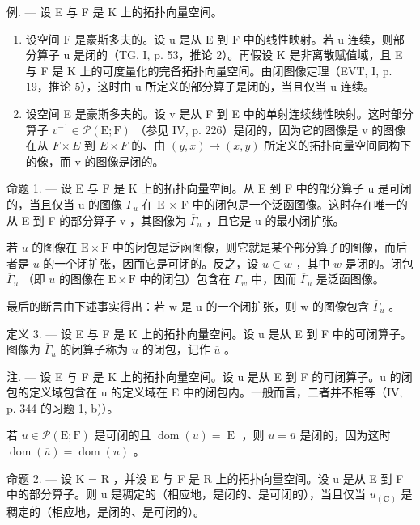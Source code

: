 例. --- 设 E 与 F 是 K 上的拓扑向量空间。

\begin{enumerate}
\def\labelenumi{\arabic{enumi})}
\item
  设空间 F 是豪斯多夫的。设 u 是从 E 到 F 中的线性映射。若 u 连续，则部分算子 u 是闭的（TG, I, p. 53，推论 2）。再假设 K 是非离散赋值域，且 E 与 F 是 K 上的可度量化的完备拓扑向量空间。由闭图像定理（EVT, I, p. 19，推论 5），这时由 u 所定义的部分算子是闭的，当且仅当 u 连续。
\item
  设空间 E 是豪斯多夫的。设 v 是从 F 到 E 中的单射连续线性映射。这时部分算子 \(v^{-1} \in \mathcal{P}(\mathrm{E};\mathrm{F})\) （参见 IV, p. 226）是闭的，因为它的图像是 v 的图像在从 \(F \times E\) 到 \(E \times F\) 的、由 \((y,x) \mapsto (x,y)\) 所定义的拓扑向量空间同构下的像，而 v 的图像是闭的。
\end{enumerate}

命题 1. --- 设 E 与 F 是 K 上的拓扑向量空间。从 E 到 F 中的部分算子 u 是可闭的，当且仅当 u 的图像 \(\Gamma_{u}\) 在 E × F 中的闭包是一个泛函图像。这时存在唯一的从 E 到 F 的部分算子 v ，其图像为 \(\overline{\Gamma}_{u}\) ，且它是 u 的最小闭扩张。

若 \(u\) 的图像在 \(\mathrm{E} \times \mathrm{F}\) 中的闭包是泛函图像，则它就是某个部分算子的图像，而后者是 \(u\) 的一个闭扩张，因而它是可闭的。反之，设 \(u \subset w\) ，其中 \(w\) 是闭的。闭包 \(\overline{\Gamma}_u\) （即 \(u\) 的图像在 \(\mathrm{E} \times \mathrm{F}\) 中的闭包）包含在 \(\Gamma_w\) 中，因而 \(\overline{\Gamma}_u\) 是泛函图像。

最后的断言由下述事实得出：若 w 是 u 的一个闭扩张，则 w 的图像包含 \(\overline{\Gamma}_{u}\) 。

定义 3. --- 设 E 与 F 是 K 上的拓扑向量空间。设 u 是从 E 到 F 中的可闭算子。图像为 \(\overline{\Gamma}_{u}\) 的闭算子称为 \(u\) 的闭包，记作 \(\overline{u}\) 。

注. --- 设 E 与 F 是 K 上的拓扑向量空间。设 u 是从 E 到 F 的可闭算子。u 的闭包的定义域包含在 u 的定义域在 E 中的闭包内。一般而言，二者并不相等（IV, p. 344 的习题 1, b)）。

若 \(u \in \mathcal{P}(\mathrm{E};\mathrm{F})\) 是可闭的且 \(\operatorname{dom}(u) = \operatorname{E}\) ，则 \(u = \overline{u}\) 是闭的，因为这时 \(\operatorname{dom}(\overline{u}) = \operatorname{dom}(u)\) 。

命题 2. --- 设 K = R ，并设 E 与 F 是 R 上的拓扑向量空间。设 u 是从 E 到 F 中的部分算子。则 u 是稠定的（相应地，是闭的、是可闭的），当且仅当 \(u_{(\mathbf{C})}\) 是稠定的（相应地，是闭的、是可闭的）。

